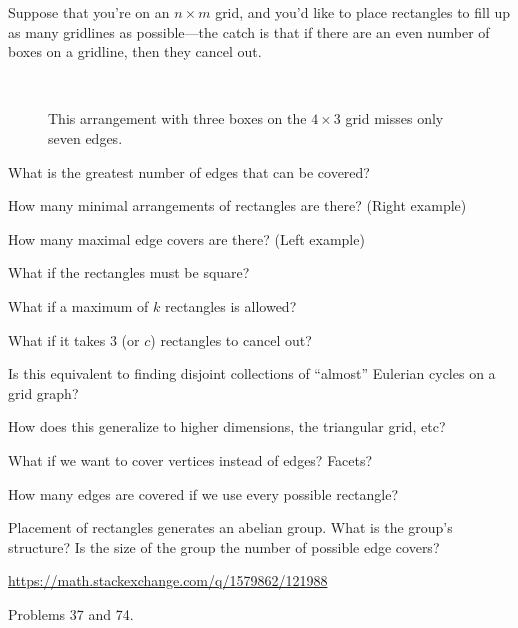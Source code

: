 \documentclass{article}
\begin{document}
Suppose that you're on an $n \times m$ grid, and you'd like to place rectangles
to fill up as many gridlines as possible---the catch is that if there are an
even  number of boxes on a gridline, then they cancel out.

\begin{figure}[ht!]
  \centering
   ~~
  \caption{This arrangement with three boxes on the $4 \times 3$ grid misses
  only seven edges.}
\end{figure}

\begin{question}
  What is the greatest number of edges that can be covered?
\end{question}

\begin{related}
  \item How many minimal arrangements of rectangles are there? (Right example)
  \item How many maximal edge covers are there? (Left example)
  \item What if the rectangles must be square?
  \item What if a maximum of $k$ rectangles is allowed?
  \item What if it takes 3 (or $c$) rectangles to cancel out?
  \item Is this equivalent to finding disjoint collections of ``almost''
    Eulerian cycles on a grid graph?
  \item How does this generalize to higher dimensions, the triangular grid, etc?
  \item What if we want to cover vertices instead of edges? Facets?
  \item How many edges are covered if we use every possible rectangle?
  \item Placement of rectangles generates an abelian group.
    What is the group's structure?
    Is the size of the group the number of possible edge covers?
\end{related}

\begin{references}
  \item \url{https://math.stackexchange.com/q/1579862/121988}
  \item Problems 37 and 74.
\end{references}
\end{document}
